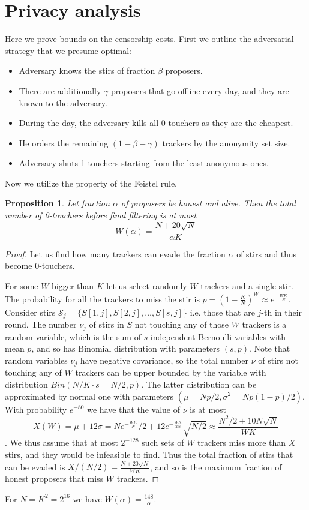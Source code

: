\documentclass{article}
\newtheorem{proposition}{Proposition}
\begin{document}
\section{Privacy analysis}




Here we prove bounds on the censorship costs. First we outline the adversarial strategy that we presume optimal:
\begin{itemize}
    \item Adversary knows the stirs of fraction $\beta$ proposers.
    \item There are additionally $\gamma$ proposers that go offline every day, and they are known to the adversary.
    \item During the day, the adversary kills all 0-touchers as they are the cheapest.
    \item He orders the remaining $(1-\beta-\gamma)$ trackers by the anonymity set size. 
    \item Adversary shuts 1-touchers starting from the least anonymous ones.
\end{itemize}

Now we utilize the property of the Feistel rule.


\begin{proposition}
Let fraction $\alpha$ of proposers be honest and alive. Then the total number of 0-touchers before final filtering is at most $$
W(\alpha) =\frac{N+20\sqrt{N}}{\alpha K}
$$

\end{proposition}
\begin{proof} Let us find how many trackers can evade the fraction $\alpha$ of stirs and thus become 0-touchers.

For some $W$ bigger than $K$ let us select randomly $W$ trackers  and a single stir. The probability for all the trackers to miss the stir is $p=(1-\frac{K}{N})^W\approx e^{-\frac{WK}{N}}$. Consider  stirs $\mathcal{S}_j=\{S[1,j],S[2,j],\ldots,S[s,j]\}$ i.e. those  that are $j$-th in their round. The number $\nu_j$ of stirs in $S$ not touching any of those $W$ trackers is a random variable, which is the sum of $s$ independent Bernoulli variables with mean $p$, and so has Binomial distribution with parameters $(s,p)$. Note that random variables $\nu_j$  have negative covariance, so the total number $\nu$ of stirs not touching any of $W$ trackers  can be upper bounded by the variable with distribution $Bin(N/K\cdot s= N/2,p)$. The latter distribution can be approximated by normal one with parameters $(\mu=Np/2,\sigma^2=Np(1-p)/2)$.  With probability $e^{-80}$ we have that  the value of $\nu$ is at most $$
X(W)=\mu+12\sigma = Ne^{-\frac{WK}{N}}/2+12e^{-\frac{WK}{2N}}\sqrt{N/2}\approx \frac{N^2/2+10N\sqrt{N}}{WK}
$$. We thus assume that at most $2^{-128}$ such sets of $W$ trackers miss more than $X$ stirs, and they would be infeasible to find. Thus the total fraction of stirs that can be evaded is $X/(N/2) = \frac{N+20\sqrt{N}}{WK}$, and so is  the maximum fraction of honest proposers that miss $W$ trackers.
\end{proof}
For $N = K^2 = 2^{16}$ we have $W(
\alpha) = \frac{148}{\alpha}$.
\end{document}
